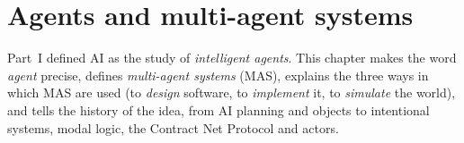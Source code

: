 \section{Agents and multi-agent systems}
\label{sec:agents-and-mas}

Part~I defined AI as the study of \emph{intelligent agents}. This chapter makes the word
\emph{agent} precise, defines \emph{multi-agent systems} (MAS), explains the three ways in
which MAS are used (to \emph{design} software, to \emph{implement} it, to \emph{simulate}
the world), and tells the history of the idea, from AI planning and objects to
intentional systems, modal logic, the Contract Net Protocol and actors.






